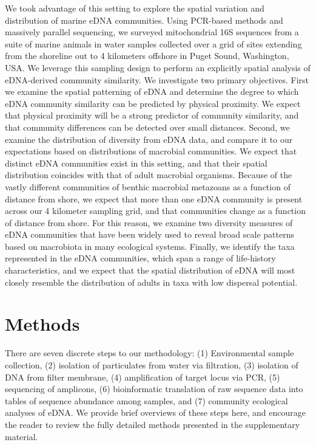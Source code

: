 \documentclass[11pt,letterpaper]{article} %
\begin{document}
We took advantage of this setting to explore the spatial variation and distribution of marine eDNA communities. Using PCR-based methods and massively parallel sequencing, we surveyed mitochondrial 16S sequences from a suite of marine animals in water samples collected over a grid of sites extending from the shoreline out to 4 kilometers offshore in Puget Sound, Washington, USA. We leverage this sampling design to perform an explicitly spatial analysis of eDNA-derived community similarity. We investigate two primary objectives. First we examine the spatial patterning of eDNA and determine the degree to which eDNA community similarity can be predicted by physical proximity. We expect that physical proximity will be a strong predictor of community similarity, and that community differences can be detected over small distances. Second, we examine the distribution of diversity from eDNA data, and compare it to our expectations based on distributions of macrobial communities. We expect that distinct eDNA communities exist in this setting, and that their spatial distribution coincides with that of adult macrobial organisms. Because of the vastly different communities of benthic macrobial metazoans as a function of distance from shore, we expect that more than one eDNA community is present across our 4 kilometer sampling grid, and that communities change as a function of distance from shore. For this reason, we examine two diversity measures of eDNA communities that have been widely used to reveal broad scale patterns based on macrobiota in many ecological systems. Finally, we identify the taxa represented in the eDNA communities, which span a range of life-history characteristics, and we expect that the spatial distribution of eDNA will most closely resemble the distribution of adults in taxa with low dispersal potential.


\section*{Methods}
There are seven discrete steps to our methodology: (1) Environmental sample collection, (2) isolation of particulates from water via filtration, (3) isolation of DNA from filter membrane, (4) amplification of target locus via PCR, (5) sequencing of amplicons, (6) bioinformatic translation of raw sequence data into tables of sequence abundance among samples, and (7) community ecological analyses of eDNA. We provide brief overviews of these steps here, and encourage the reader to review the fully detailed methods presented in the supplementary material.
\end{document}
